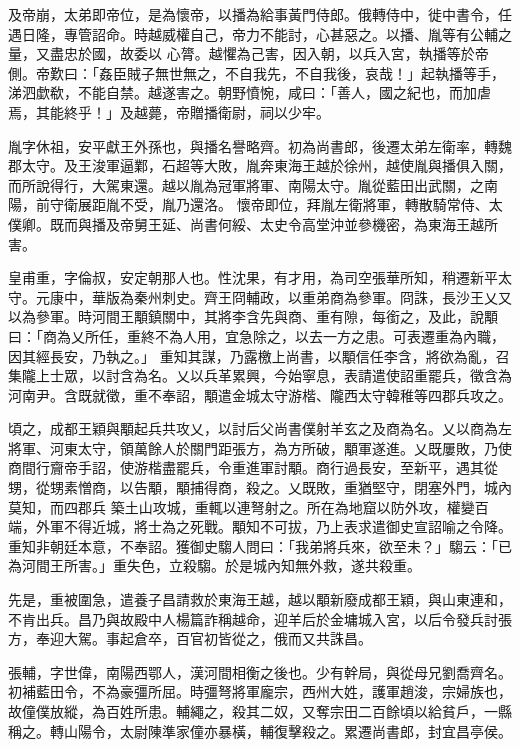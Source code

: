 \begin{pinyinscope}
 及帝崩，太弟即帝位，是為懷帝，以播為給事黃門侍郎。俄轉侍中，徙中書令，任遇日隆，專管詔命。時越威權自己，帝力不能討，心甚惡之。以播、胤等有公輔之量，又盡忠於國，故委以
 心膂。越懼為己害，因入朝，以兵入宮，執播等於帝側。帝歎曰：「姦臣賊子無世無之，不自我先，不自我後，哀哉！」起執播等手，涕泗歔欷，不能自禁。越遂害之。朝野憤惋，咸曰：「善人，國之紀也，而加虐焉，其能終乎！」及越薨，帝贈播衛尉，祠以少牢。



 胤字休祖，安平獻王外孫也，與播名譽略齊。初為尚書郎，後遷太弟左衛率，轉魏郡太守。及王浚軍逼鄴，石超等大敗，胤奔東海王越於徐州，越使胤與播俱入關，而所說得行，大駕東還。越以胤為冠軍將軍、南陽太守。胤從藍田出武關，之南陽，前守衛展距胤不受，胤乃還洛。
 懷帝即位，拜胤左衛將軍，轉散騎常侍、太僕卿。既而與播及帝舅王延、尚書何綏、太史令高堂沖並參機密，為東海王越所害。



 皇甫重，字倫叔，安定朝那人也。性沈果，有才用，為司空張華所知，稍遷新平太守。元康中，華版為秦州刺史。齊王冏輔政，以重弟商為參軍。冏誅，長沙王乂又以為參軍。時河間王顒鎮關中，其將李含先與商、重有隙，每銜之，及此，說顒曰：「商為乂所任，重終不為人用，宜急除之，以去一方之患。可表遷重為內職，因其經長安，乃執之。」
 重知其謀，乃露檄上尚書，以顒信任李含，將欲為亂，召集隴上士眾，以討含為名。乂以兵革累興，今始寧息，表請遣使詔重罷兵，徵含為河南尹。含既就徵，重不奉詔，顒遣金城太守游楷、隴西太守韓稚等四郡兵攻之。



 頃之，成都王穎與顒起兵共攻乂，以討后父尚書僕射羊玄之及商為名。乂以商為左將軍、河東太守，領萬餘人於關門距張方，為方所破，顒軍遂進。乂既屢敗，乃使商間行齎帝手詔，使游楷盡罷兵，令重進軍討顒。商行過長安，至新平，遇其從甥，從甥素憎商，以告顒，顒捕得商，殺之。乂既敗，重猶堅守，閉塞外門，城內莫知，而四郡兵
 築土山攻城，重輒以連弩射之。所在為地窟以防外攻，權變百端，外軍不得近城，將士為之死戰。顒知不可拔，乃上表求遣御史宣詔喻之令降。重知非朝廷本意，不奉詔。獲御史騶人問曰：「我弟將兵來，欲至未？」騶云：「已為河間王所害。」重失色，立殺騶。於是城內知無外救，遂共殺重。



 先是，重被圍急，遣養子昌請救於東海王越，越以顒新廢成都王穎，與山東連和，不肯出兵。昌乃與故殿中人楊篇詐稱越命，迎羊后於金墉城入宮，以后令發兵討張方，奉迎大駕。事起倉卒，百官初皆從之，俄而又共誅昌。



 張輔，字世偉，南陽西鄂人，漢河間相衡之後也。少有幹局，與從母兄劉喬齊名。初補藍田令，不為豪彊所屈。時彊弩將軍龐宗，西州大姓，護軍趙浚，宗婦族也，故僮僕放縱，為百姓所患。輔繩之，殺其二奴，又奪宗田二百餘頃以給貧戶，一縣稱之。轉山陽令，太尉陳準家僮亦暴橫，輔復擊殺之。累遷尚書郎，封宜昌亭侯。




\end{pinyinscope}
